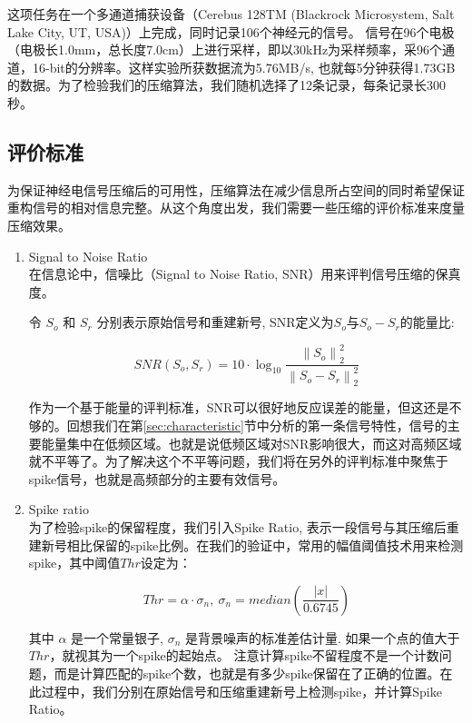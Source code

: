 这项任务在一个多通道捕获设备（Cerebus 128TM (Blackrock Microsystem, Salt Lake City, UT, USA)）上完成，同时记录106个神经元的信号。 信号在96个电极（电极长1.0mm，总长度7.0cm）上进行采样，即以30kHz为采样频率，采96个通道，16-bit的分辨率。这样实验所获数据流为5.76MB/s, 也就每5分钟获得1.73GB的数据。为了检验我们的压缩算法，我们随机选择了12条记录，每条记录长300秒。




\subsection{评价标准}
为保证神经电信号压缩后的可用性，压缩算法在减少信息所占空间的同时希望保证重构信号的相对信息完整\cite{24}。从这个角度出发，我们需要一些压缩的评价标准来度量压缩效果。

\begin{enumerate}
\item{Signal to Noise Ratio}\\
在信息论中，信噪比（Signal to Noise Ratio, SNR）用来评判信号压缩的保真度。

令 $S_o$ 和 $S_r$ 分别表示原始信号和重建新号, SNR定义为$S_o$与$S_o-S_r$的能量比:


\begin{equation}\label{Eq:SNR Def}
  SNR(S_o,S_r)=10\cdot \log_{10} \frac{\left\|S_o\right\|_2^2}{\left\|S_o-S_r\right\|_2^2}
\end{equation}

作为一个基于能量的评判标准，SNR可以很好地反应误差的能量，但这还是不够的。回想我们在第\ref{sec:characteristic}节中分析的第一条信号特性，信号的主要能量集中在低频区域。也就是说低频区域对SNR影响很大，而这对高频区域就不平等了。为了解决这个不平等问题，我们将在另外的评判标准中聚焦于spike信号，也就是高频部分的主要有效信号。

\item{Spike ratio}\\
为了检验spike的保留程度，我们引入Spike Ratio, 表示一段信号与其压缩后重建新号相比保留的spike比例。在我们的验证中，常用的幅值阈值技术\cite{34}用来检测spike，其中阈值$Thr$设定为：


\begin{equation}\label{Eq: Spike Detection Threshold}
  Thr=\alpha \cdot \sigma_n,\ \sigma_n=median\left(\frac{|x|}{0.6745}\right)
\end{equation}

其中 $\alpha$ 是一个常量银子, $\sigma_n$ 是背景噪声的标准差估计量. 如果一个点的值大于 $Thr$，就视其为一个spike的起始点。 注意计算spike不留程度不是一个计数问题，而是计算匹配的spike个数，也就是有多少spike保留在了正确的位置。在此过程中，我们分别在原始信号和压缩重建新号上检测spike，并计算Spike Ratio。


\end{enumerate}

